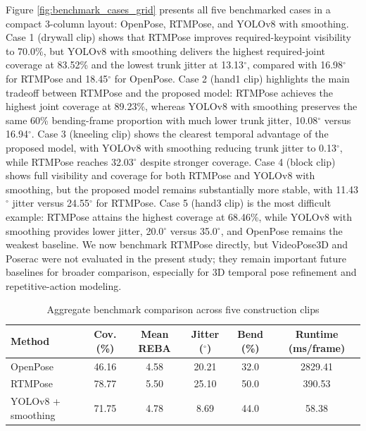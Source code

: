 \documentclass[11pt]{article}
\begin{document}
  Figure \ref{fig:benchmark_cases_grid} presents all five benchmarked cases in a compact 3-column layout: OpenPose, RTMPose, and YOLOv8 with smoothing. Case 1 (drywall clip) shows that RTMPose improves required-keypoint visibility to 70.0\%, but YOLOv8 with smoothing delivers the highest required-joint coverage at 83.52\% and the lowest trunk jitter at 13.13$^\circ$, compared with 16.98$^\circ$ for RTMPose and 18.45$^\circ$ for OpenPose. Case 2 (hand1 clip) highlights the main tradeoff between RTMPose and the proposed model: RTMPose achieves the highest joint coverage at 89.23\%, whereas YOLOv8 with smoothing preserves the same 60\% bending-frame proportion with much lower trunk jitter, 10.08$^\circ$ versus 16.94$^\circ$. Case 3 (kneeling clip) shows the clearest temporal advantage of the proposed model, with YOLOv8 with smoothing reducing trunk jitter to 0.13$^\circ$, while RTMPose reaches 32.03$^\circ$ despite stronger coverage. Case 4 (block clip) shows full visibility and coverage for both RTMPose and YOLOv8 with smoothing, but the proposed model remains substantially more stable, with 11.43$^\circ$ jitter versus 24.55$^\circ$ for RTMPose. Case 5 (hand3 clip) is the most difficult example: RTMPose attains the highest coverage at 68.46\%, while YOLOv8 with smoothing provides lower jitter, 20.0$^\circ$ versus 35.0$^\circ$, and OpenPose remains the weakest baseline. We now benchmark RTMPose directly, but VideoPose3D and Poserac were not evaluated in the present study; they remain important future baselines for broader comparison, especially for 3D temporal pose refinement and repetitive-action modeling.

\begin{table}[H]
\centering
\scriptsize
\caption{Aggregate benchmark comparison across five construction clips}
\setlength{\tabcolsep}{4pt}
\renewcommand{\arraystretch}{0.95}
  \begin{tabular}{lccccc}
 \toprule
\textbf{Method} &  \textbf{Cov. (\%)} & \textbf{Mean REBA} &  \textbf{Jitter ($^\circ$)} & \textbf{Bend (\%)} & \textbf{Runtime (ms/frame)} \\
\midrule
OpenPose & 46.16 & 4.58 & 20.21 & 32.0 & 2829.41 \\
RTMPose & 78.77 & 5.50 & 25.10 & 50.0 & 390.53 \\
YOLOv8 + smoothing & 71.75 & 4.78 & 8.69 & 44.0 & 58.38 \\
\bottomrule
\end{tabular}
\label{table:benchmark_summary}
\end{table}
\end{document}
